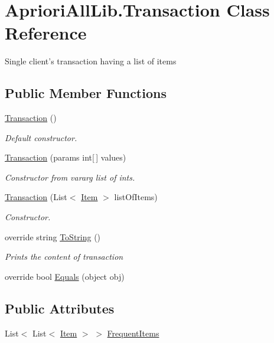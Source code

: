 \hypertarget{class_apriori_all_lib_1_1_transaction}{\section{Apriori\-All\-Lib.\-Transaction Class Reference}
\label{class_apriori_all_lib_1_1_transaction}
}


Single client's transaction having a list of items  


\subsection*{Public Member Functions}
\begin{DoxyCompactItemize}
\item 
\hyperlink{class_apriori_all_lib_1_1_transaction_adad35699bc55fcba5ee7ad28d34bdf53}{Transaction} ()
\begin{DoxyCompactList}\small\item\em Default constructor. \end{DoxyCompactList}\item 
\hyperlink{class_apriori_all_lib_1_1_transaction_a582a1d655d1c0d452a5e5f0b972688dd}{Transaction} (params int\mbox{[}$\,$\mbox{]} values)
\begin{DoxyCompactList}\small\item\em Constructor from vararg list of ints. \end{DoxyCompactList}\item 
\hyperlink{class_apriori_all_lib_1_1_transaction_a4a114cb49deabd17311768a8ecdf38a5}{Transaction} (List$<$ \hyperlink{class_apriori_all_lib_1_1_item}{Item} $>$ list\-Of\-Items)
\begin{DoxyCompactList}\small\item\em Constructor. \end{DoxyCompactList}\item 
override string \hyperlink{class_apriori_all_lib_1_1_transaction_acee1a8846d87f949c63110f7e6eabfe0}{To\-String} ()
\begin{DoxyCompactList}\small\item\em Prints the content of transaction \end{DoxyCompactList}\item 
override bool \hyperlink{class_apriori_all_lib_1_1_transaction_a30328717fdd46c8c8eea3a86310db3dd}{Equals} (object obj)
\end{DoxyCompactItemize}
\subsection*{Public Attributes}
\begin{DoxyCompactItemize}
\item 
List$<$ List$<$ \hyperlink{class_apriori_all_lib_1_1_item}{Item} $>$ $>$ \hyperlink{class_apriori_all_lib_1_1_transaction_a2ee6b2f74a842edb646ec8f99e5f7b8f}{Frequent\-Items}
\end{DoxyCompactItemize}
